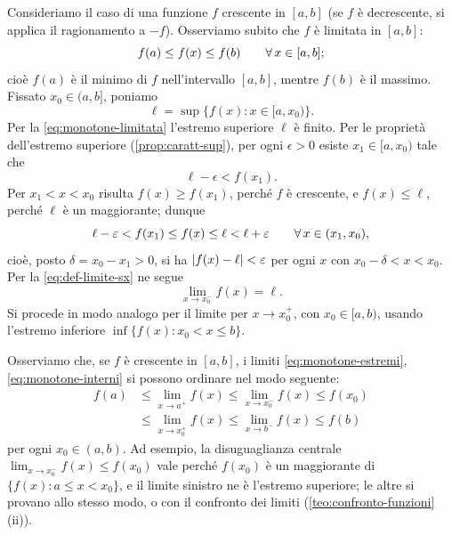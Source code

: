 \begin{dimostrazione}
Consideriamo il caso di una funzione $f$ crescente in $[a,b]$ (se $f$ è decrescente, si
applica il ragionamento a $-f$). Osserviamo subito che $f$ è limitata in $[a,b]$:
\begin{equation}\label{eq:monotone-limitata}
  f(a)\le f(x)\le f(b) \qquad\forall\, x\in[a,b];
\end{equation}
cioè $f(a)$ è il minimo di $f$ nell'intervallo $[a,b]$, mentre $f(b)$ è il massimo.
Fissato $x_{0}\in(a,b]$, poniamo
\begin{equation}\label{eq:monotone-ell}
  \ell=\sup\{f(x) : x\in[a,x_{0})\}.
\end{equation}
Per la \eqref{eq:monotone-limitata} l'estremo superiore $\ell$ è finito. Per le proprietà
dell'estremo superiore (\cref{prop:caratt-sup}), per ogni $\epsilon>0$ esiste
$x_{1}\in[a,x_{0})$ tale che
\begin{equation}\label{eq:monotone-x1}
  \ell-\epsilon<f(x_{1}).
\end{equation}
Per $x_{1}<x<x_{0}$ risulta $f(x)\ge f(x_{1})$, perché $f$ è crescente, e $f(x)\le\ell$,
perché $\ell$ è un maggiorante; dunque
\begin{equation}\label{eq:monotone-catena}
  \ell-\varepsilon<f(x_{1})\le f(x)\le\ell<\ell+\varepsilon \qquad\forall\, x\in(x_{1},x_{0}),
\end{equation}
cioè, posto $\delta=x_{0}-x_{1}>0$, si ha $\lvert f(x)-\ell\rvert<\varepsilon$ per ogni $x$ con
$x_{0}-\delta<x<x_{0}$. Per la \eqref{eq:def-limite-sx} ne segue
\begin{equation}\label{eq:monotone-limite}
  \lim_{x\to x_{0}^{-}}f(x)=\ell .
\end{equation}
Si procede in modo analogo per il limite per $x\to x_{0}^{+}$, con $x_{0}\in[a,b)$,
usando l'estremo inferiore $\inf\{f(x) : x_{0}<x\le b\}$.
\end{dimostrazione}

Osserviamo che, se $f$ è crescente in $[a,b]$, i limiti \eqref{eq:monotone-estremi},
\eqref{eq:monotone-interni} si possono ordinare nel modo seguente:
\begin{equation}\label{eq:monotone-ordine}
\begin{split}
  f(a)&\le\lim_{x\to a^{+}}f(x)\le\lim_{x\to x_{0}^{-}}f(x)\le f(x_{0})\\
  &\le\lim_{x\to x_{0}^{+}}f(x)\le\lim_{x\to b^{-}}f(x)\le f(b)
\end{split}
\end{equation}
per ogni $x_{0}\in(a,b)$. Ad esempio, la disuguaglianza centrale
$\lim_{x\to x_{0}^{-}}f(x)\le f(x_{0})$ vale perché $f(x_{0})$ è un maggiorante di
$\{f(x) : a\le x<x_{0}\}$, e il limite sinistro ne è l'estremo superiore; le altre si
provano allo stesso modo, o con il confronto dei limiti (\cref{teo:confronto-funzioni}(ii)).

